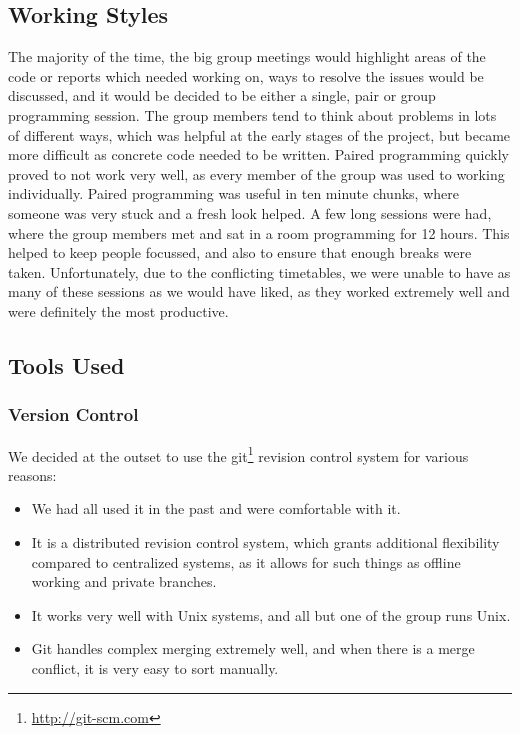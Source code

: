   \subsection{Working Styles}
  The majority of the time, the big group meetings would highlight areas of the code or reports which needed working on, ways to resolve the issues would be discussed, and it would be decided to be either a single, pair or group programming session. The group members tend to think about problems in lots of different ways, which was helpful at the early stages of the project, but became more difficult as concrete code needed to be written. Paired programming quickly proved to not work very well, as every member of the group was used to working individually. Paired programming was useful in ten minute chunks, where someone was very stuck and a fresh look helped.
  A few long sessions were had, where the group members met and sat in a room programming for 12 hours. This helped to keep people focussed, and also to ensure that enough breaks were taken. Unfortunately, due to the conflicting timetables, we were unable to have as many of these sessions as we would have liked, as they worked extremely well and were definitely the most productive.

  \subsection{Tools Used}
    \subsubsection{Version Control}
      We decided at the outset to use the git\footnote{\url{http://git-scm.com}} revision control system for various reasons:
      \begin{itemize}
      \item We had all used it in the past and were comfortable with it.
      \item It is a distributed revision control system, which grants additional flexibility compared to centralized systems, as it allows for such things as offline working and private branches.
      \item It works very well with Unix systems, and all but one of the group runs Unix.
      \item Git handles complex merging extremely well, and when there is a merge conflict, it is very easy to sort manually.
      \end{itemize}

